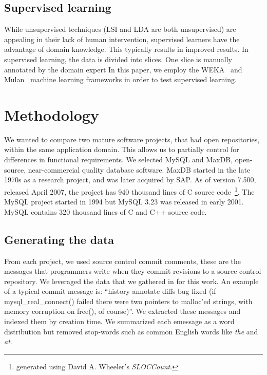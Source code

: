 \documentclass{acm_proc_article-sp}
\newcommand{\XXX}[1]{\textcolor{red}{{\it \textbf{[XXX: #1]}}}}
\begin{document}
\subsection{Supervised learning}
While unsupervised techniques (LSI and LDA are both unsupervised) are appealing in their lack of human intervention, supervised learners have the advantage of domain knowledge. This typically results in improved results. In supervised learning, the data is divided into slices. One slice is manually annotated by the domain expert
In this paper, we employ the WEKA~\cite{weka09} and Mulan~\cite{mulan} machine learning frameworks in order to test supervised learning.
 
\section{Methodology}

We wanted to compare two mature software projects, that had open repositories, within the same application domain. This allows us to partially control for differences in functional requirements. We selected MySQL and MaxDB, open-source, near-commercial quality database software. MaxDB started in the late 1970s as a research project, and was later acquired by SAP. As of version 7.500, released April 2007, the project has 940 thousand lines of C source code~\footnote{generated using David A. Wheeler's \emph{SLOCCount}.}.
The MySQL project started in 1994 but MySQL 3.23 was released in early 2001. MySQL contains 320 thousand lines of C and C++ source code. 

\subsection{Generating the data}
From each project, we used source control commit comments, these are the messages that programmers write when they commit revisions to a source control repository. We leveraged the data that we gathered in \cite{Hindle09ICSM} for this work. An example of a typical commit message is: ``history annotate diffs bug fixed (if mysql\_real\_connect() failed there were two pointers to malloc'ed strings, with memory corruption on free(), of course)''. We extracted these messages and indexed them by creation time. We summarized each emessage as a word distribution but removed stop-words such as   common English words like \emph{the} and \emph{at}.
\end{document}
